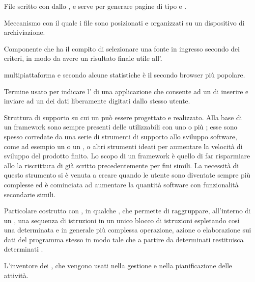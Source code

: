 {
{File scritto con   dallo , e serve per generare pagine di tipo  e .}

{Meccanismo con il quale i file sono posizionati e organizzati su un dispositivo di archiviazione.}

{Componente che ha il compito di selezionare una fonte in ingresso secondo dei criteri, in modo da avere un risultato finale utile all'.}

{  multipiattaforma e secondo alcune statistiche è il secondo browser più popolare.}

{Termine usato per indicare l' di una applicazione che consente ad un  di inserire e inviare ad un  dei dati liberamente digitati dallo stesso utente.}

{Struttura di supporto su cui un  può essere progettato e realizzato. Alla base di un framework sono sempre presenti delle  utilizzabili con uno o più ; esse sono spesso corredate da una serie di strumenti di supporto allo sviluppo software, come ad esempio un  o un , o altri strumenti ideati per aumentare la velocità di sviluppo del prodotto finito.
Lo scopo di un framework è quello di far risparmiare allo  la riscrittura di  già scritto precedentemente per fini simili. La necessità di questo strumento si è venuta a creare quando le  utente sono diventate sempre più complesse ed è cominciata ad aumentare la quantità software con funzionalità secondarie simili.}

{Particolare costrutto con , in qualche , che permette di raggruppare, all'interno di un , una sequenza di istruzioni in un unico blocco di istruzioni espletando così una determinata e in generale più complessa operazione, azione o elaborazione sui dati del programma stesso in modo tale che a partire da determinati  restituisca determinati .}




{L'inventore dei , che vengono usati nella gestione e nella pianificazione delle attività.}

}
